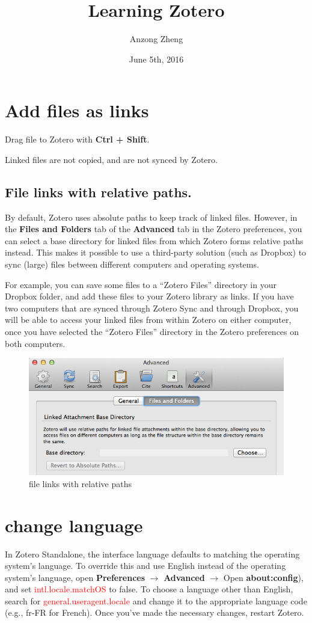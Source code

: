 \documentclass[10pt,a4paper]{article}
\begin{document}
\author{Anzong Zheng}
\title{Learning Zotero}
\date{June 5th, 2016}
\maketitle

\tableofcontents

\newpage
\section{Add files as links}
Drag file to Zotero with \textbf{Ctrl + Shift}.

Linked files are not copied, and are not synced by Zotero.

\subsection{File links with relative paths.}
By default, Zotero uses absolute paths to keep track of linked files. However, in the \textbf{Files and Folders} tab of the \textbf{Advanced} tab in the Zotero preferences, you can select a base directory for linked files from which Zotero forms relative paths instead. This makes it possible to use a third-party solution (such as Dropbox) to sync (large) files between different computers and operating systems.

For example, you can save some files to a “Zotero Files” directory in your Dropbox folder, and add these files to your Zotero library as links. If you have two computers that are synced through Zotero Sync and through Dropbox, you will be able to access your linked files from within Zotero on either computer, once you have selected the “Zotero Files” directory in the Zotero preferences on both computers.

\begin{figure}
\centering
\includegraphics[width=0.7\linewidth]{file_link_with_relative_paths}
\caption{file links with relative paths}
\label{fig:file_link_with_relative_paths}
\end{figure}

\section{change language}
In Zotero Standalone, the interface language defaults to matching the operating system's language. To override this and use English instead of the operating system's language, open \textbf{Preferences} $ \rightarrow $ \textbf{Advanced} $ \rightarrow $ Open \textbf{about:config}), and set \textcolor{red}{intl.locale.matchOS} to false. To choose a language other than English, search for \textcolor{red}{general.useragent.locale} and change it to the appropriate language code (e.g., fr-FR for French). Once you've made the necessary changes, restart Zotero.
\end{document}

